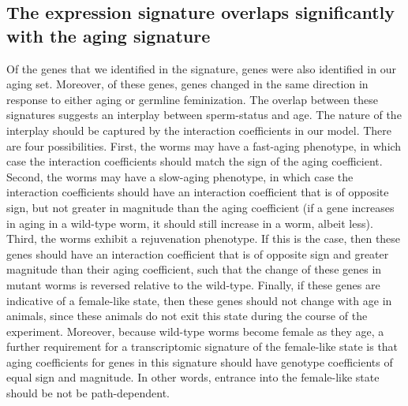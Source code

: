 \subsection*{The \fog{} expression signature overlaps significantly with the aging
signature}
Of the \fogn{} genes that we identified in the \fog{} signature, \intersectn{}
genes were also identified in our aging set. Moreover, of these \intersectn{}
genes, \coexpressed{} genes changed in the same direction in response to either
aging or germline feminization. The overlap between these signatures suggests an
interplay between sperm-status and age. The nature of the interplay should be
captured by the interaction coefficients in our model. There are four
possibilities. First, the \fog{} worms may have a fast-aging phenotype, in which
case the interaction coefficients should match the sign of the aging
coefficient. Second, the \fog{} worms may have a slow-aging phenotype, in which
case the interaction coefficients should have an interaction coefficient that is
of opposite sign, but not greater in magnitude than the aging coefficient (if a
gene increases in aging in a wild-type worm, it should still increase in a
\fog{} worm, albeit less). Third, the \fog{} worms exhibit a rejuvenation
phenotype. If this is the case, then these genes should have an interaction
coefficient that is of opposite sign and greater magnitude than their aging
coefficient, such that the change of these genes in \fog{} mutant worms is
reversed relative to the wild-type. Finally, if these genes are indicative of a
female-like state, then these genes should not change with age in \fog{} animals,
since these animals do not exit this state during the course of the experiment.
Moreover, because wild-type worms become female as they age, a further
requirement for a transcriptomic signature of the female-like state is that aging
coefficients for genes in this signature should have genotype coefficients of
equal sign and magnitude. In other words, entrance into the female-like state should
be not be path-dependent.


